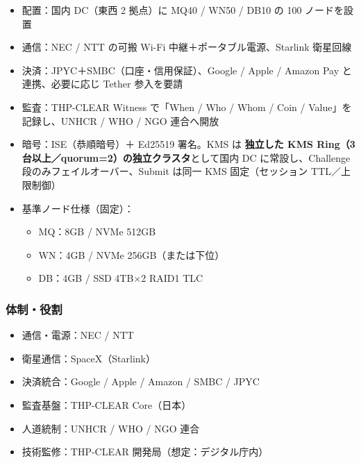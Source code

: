 \documentclass[
]{article}
\providecommand{\tightlist}{%
  \setlength{\itemsep}{0pt}\setlength{\parskip}{0pt}}
\begin{document}
\begin{itemize}
\tightlist
\item
  配置：国内 DC（東西 2 拠点）に MQ40 / WN50 / DB10 の 100
  ノードを設置\\
\item
  通信：NEC / NTT の可搬 Wi-Fi 中継＋ポータブル電源、Starlink 衛星回線\\
\item
  決済：JPYC＋SMBC（口座・信用保証）、Google / Apple / Amazon Pay
  と連携、必要に応じ Tether 参入を要請\\
\item
  監査：THP-CLEAR Witness で「When / Who / Whom / Coin /
  Value」を記録し、UNHCR / WHO / NGO 連合へ開放\\
\item
  暗号：ISE（恭順暗号）＋ Ed25519 署名。KMS は \textbf{独立した KMS
  Ring（3台以上／quorum=2）の独立クラスタ}として国内 DC
  に常設し、Challenge 段のみフェイルオーバー、Submit は同一 KMS
  固定（セッション TTL／上限制御）\\
\item
  基準ノード仕様（固定）：

  \begin{itemize}
  \tightlist
  \item
    MQ：8GB / NVMe 512GB\\
  \item
    WN：4GB / NVMe 256GB（または下位）\\
  \item
    DB：4GB / SSD 4TB×2 RAID1 TLC
  \end{itemize}
\end{itemize}

\subsubsection{体制・役割}\label{ux4f53ux5236ux5f79ux5272}

\begin{itemize}
\tightlist
\item
  通信・電源：NEC / NTT\\
\item
  衛星通信：SpaceX（Starlink）\\
\item
  決済統合：Google / Apple / Amazon / SMBC / JPYC\\
\item
  監査基盤：THP-CLEAR Core（日本）\\
\item
  人道統制：UNHCR / WHO / NGO 連合\\
\item
  技術監修：THP-CLEAR 開発局（想定：デジタル庁内）
\end{itemize}
\end{document}
